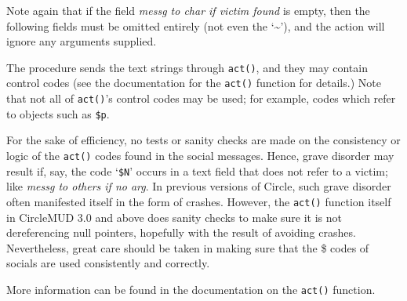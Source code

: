 \documentclass[11pt]{article}
\begin{document}
Note again that if the field {\it messg to char if victim found} is empty, then the following fields must be omitted entirely (not even the `\~{}'), and the action will ignore any arguments supplied.
\par
The procedure sends the text strings through \texttt{act()}, and they may contain control codes (see the documentation for the \texttt{act()} function for details.) Note that not all of \texttt{act()}'s control codes may be used; for example, codes which refer to objects such as \texttt{\$p}.
\par
For the sake of efficiency, no tests or sanity checks are made on the consistency or logic of the \texttt{act()} codes found in the social messages. Hence, grave disorder may result if, say, the code `\texttt{\$N}' occurs in a text field that does not refer to a victim; like {\it messg to others if no arg}.
In previous versions of Circle, such grave disorder often manifested itself in the form of crashes.  However, the \texttt{act()} function itself in CircleMUD 3.0 and above does sanity checks to make sure it is not dereferencing null pointers, hopefully with the result of avoiding crashes.  Nevertheless, great care should be taken in making sure that the \$ codes of socials are used consistently and correctly.
\par
More information can be found in the documentation on the \texttt{act()} function.
\end{document}
